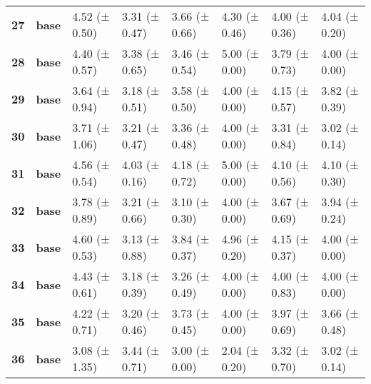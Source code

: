 \begin{longtable}{llllllll}
\cline{1-8}
\textbf{27} & \textbf{base} & 4.52 (± 0.50) & 3.31 (± 0.47) & 3.66 (± 0.66) & 4.30 (± 0.46) & 4.00 (± 0.36) & 4.04 (± 0.20) \\
\cline{1-8}
\textbf{28} & \textbf{base} & 4.40 (± 0.57) & 3.38 (± 0.65) & 3.46 (± 0.54) & 5.00 (± 0.00) & 3.79 (± 0.73) & 4.00 (± 0.00) \\
\cline{1-8}
\textbf{29} & \textbf{base} & 3.64 (± 0.94) & 3.18 (± 0.51) & 3.58 (± 0.50) & 4.00 (± 0.00) & 4.15 (± 0.57) & 3.82 (± 0.39) \\
\cline{1-8}
\textbf{30} & \textbf{base} & 3.71 (± 1.06) & 3.21 (± 0.47) & 3.36 (± 0.48) & 4.00 (± 0.00) & 3.31 (± 0.84) & 3.02 (± 0.14) \\
\cline{1-8}
\textbf{31} & \textbf{base} & 4.56 (± 0.54) & 4.03 (± 0.16) & 4.18 (± 0.72) & 5.00 (± 0.00) & 4.10 (± 0.56) & 4.10 (± 0.30) \\
\cline{1-8}
\textbf{32} & \textbf{base} & 3.78 (± 0.89) & 3.21 (± 0.66) & 3.10 (± 0.30) & 4.00 (± 0.00) & 3.67 (± 0.69) & 3.94 (± 0.24) \\
\cline{1-8}
\textbf{33} & \textbf{base} & 4.60 (± 0.53) & 3.13 (± 0.88) & 3.84 (± 0.37) & 4.96 (± 0.20) & 4.15 (± 0.37) & 4.00 (± 0.00) \\
\cline{1-8}
\textbf{34} & \textbf{base} & 4.43 (± 0.61) & 3.18 (± 0.39) & 3.26 (± 0.49) & 4.00 (± 0.00) & 4.00 (± 0.83) & 4.00 (± 0.00) \\
\cline{1-8}
\textbf{35} & \textbf{base} & 4.22 (± 0.71) & 3.20 (± 0.46) & 3.73 (± 0.45) & 4.00 (± 0.00) & 3.97 (± 0.69) & 3.66 (± 0.48) \\
\cline{1-8}
\textbf{36} & \textbf{base} & 3.08 (± 1.35) & 3.44 (± 0.71) & 3.00 (± 0.00) & 2.04 (± 0.20) & 3.32 (± 0.70) & 3.02 (± 0.14) \\
\cline{1-8}
\end{longtable}
